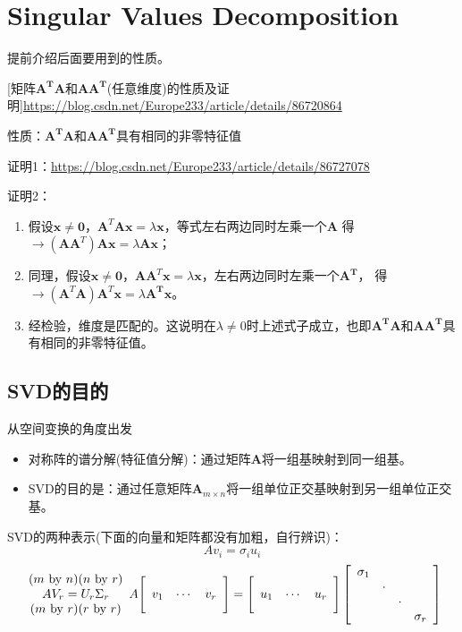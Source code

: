 \section{Singular Values Decomposition}
提前介绍后面要用到的性质。

[矩阵$\bm{A^TA}$和$\bm{AA^T}$(任意维度)的性质及证明]\url{https://blog.csdn.net/Europe233/article/details/86720864}

性质：$\bm{A^TA}$和$\bm{AA^T}$具有相同的非零特征值

证明1：\url{https://blog.csdn.net/Europe233/article/details/86727078}

证明2：
\begin{enumerate}
    \item 假设$\bm{x} \neq \bm{0}$，$\bm{A}^T\bm{Ax}=\lambda \bm{x}$，等式左右两边同时左乘一个$\bm{A}$
    得$\bm{\rightarrow} (\bm{AA}^T)\bm{Ax}=\lambda \bm{Ax}$；
    \item 同理，假设$\bm{x} \neq \bm{0}$，$\bm{AA}^T\bm{x}=\lambda \bm{x}$，左右两边同时左乘一个$\bm{A^T}$，
    得$\bm{\rightarrow} (\bm{A}^T\bm{A})\bm{A}^T\bm{x}=\lambda \bm{A^T}\bm{x}$。
    \item 经检验，维度是匹配的。这说明在$\lambda \neq 0$时上述式子成立，也即$\bm{A^TA}$和$\bm{AA^T}$具有相同的非零特征值。
\end{enumerate}

\subsection{SVD的目的}
从空间变换的角度出发
\begin{itemize}
    \item 对称阵的谱分解(特征值分解)：通过矩阵$\bm{A}$将一组基映射到同一组基。
    \item SVD的目的是：通过任意矩阵$\bm{A}_{m\times n}$将一组单位正交基映射到另一组单位正交基。
\end{itemize}

SVD的两种表示(下面的向量和矩阵都没有加粗，自行辨识)：
$$A v_{i}=\sigma_{i} u_{i}$$
$$\begin{array}{c}
(m \text { by } n)(n \text { by } r) \\
A V_{r}=U_{r} \Sigma_{r} \\
(m \text { by } r)(r \text { by } r)
\end{array}
\\
A\Bigg[\begin{array}{lll}
v_{1} & \cdots & v_{r}
\end{array}\Bigg]=\Bigg[\begin{array}{lll}
u_{1} & \cdots & u_{r}
\end{array}\Bigg]\left[\begin{array}{cccc}
\sigma_{1} & & & \\
& \cdot & \\
& & \cdot & \\
& & & \sigma_{r}
\end{array}\right]$$


